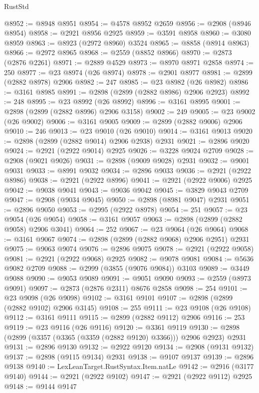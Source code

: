 \begin{lexlean}{RustStd}
\begin{coremodule}
@8952 := @8948 @8951
@8954 := @4578 @8952 @2659
@8956 := @2908 (@8946 @8954)
@8958 := @2921 @8956 @2925
@8959 := @3591 @8958
@8960 := @3080 @8959
@8963 := @8923 (@2972 @8960) @3524
@8965 := @8858 (@8914 @8963)
@8966 := @2972 @8965
@8968 := @2559 (@8852 @8966)
@8970 := @2873 (@2876 @2261)
@8971 := @2889 @4529
@8973 := @8970 @8971 @2858
@8974 := 250
@8977 := @23 @8974 (@26 @8974)
@8978 := @2901 @8977
@8981 := @2899 (@2882 @8978) @2906
@8982 := 247
@8985 := @23 @8982 (@26 @8982)
@8986 := @3161 @8985
@8991 := @2898 (@2899 (@2882 @8986) @2906 @2923)
@8992 := 248
@8995 := @23 @8992 (@26 @8992)
@8996 := @3161 @8995
@9001 := @2898 (@2899 (@2882 @8996) @2906 @3158)
@9002 := 249
@9005 := @23 @9002 (@26 @9002)
@9006 := @3161 @9005
@9009 := @2899 (@2882 @9006) @2906
@9010 := 246
@9013 := @23 @9010 (@26 @9010)
@9014 := @3161 @9013
@9020 := @2898 (@2899 (@2882 @9014) @2906 @2938) @2931
@9021 := @2896 @9020
@9024 := @2921 (@2922 @9014) @2925
@9026 := @3228 @9024 @2709
@9028 := @2908 (@9021 @9026)
@9031 := @2898 (@9009 @9028) @2931
@9032 := @9001 @9031
@9033 := @8991 @9032
@9034 := @2896 @9033
@9036 := @2921 (@2922 @8986)
@9038 := @2921 (@2922 @8996)
@9041 := @2921 (@2922 @9006) @2925
@9042 := @9038 @9041
@9043 := @9036 @9042
@9045 := @3829 @9043 @2709
@9047 := @2908 (@9034 @9045)
@9050 := @2898 (@8981 @9047) @2931
@9051 := @2896 @9050
@9053 := @2995 (@2922 @8978)
@9054 := 251
@9057 := @23 @9054 (@26 @9054)
@9058 := @3161 @9057
@9063 := @2898 (@2899 (@2882 @9058) @2906 @3041)
@9064 := 252
@9067 := @23 @9064 (@26 @9064)
@9068 := @3161 @9067
@9074 := @2898 (@2899 (@2882 @9068) @2906 @2951) @2931
@9075 := @9063 @9074
@9076 := @2896 @9075
@9078 := @2921 (@2922 @9058)
@9081 := @2921 (@2922 @9068) @2925
@9082 := @9078 @9081
@9084 := @5636 @9082 @2709
@9088 := @2999 (@3855 (@9076 @9084)) @3103
@9089 := @3449 @9088
@9090 := @9053 @9089
@9091 := @9051 @9090
@9093 := @2559 (@8973 @9091)
@9097 := @2873 (@2876 @2311) @8676 @2858
@9098 := 254
@9101 := @23 @9098 (@26 @9098)
@9102 := @3161 @9101
@9107 := @2898 (@2899 (@2882 @9102) @2906 @3145)
@9108 := 255
@9111 := @23 @9108 (@26 @9108)
@9112 := @3161 @9111
@9115 := @2899 (@2882 @9112) @2906
@9116 := 253
@9119 := @23 @9116 (@26 @9116)
@9120 := @3361 @9119
@9130 := @2898 (@2899 (@3357 (@3365 (@3359 (@2882 @9120) @3366))) @2906 @2923) @2931
@9131 := @2896 @9130
@9132 := @2922 @9120
@9134 := @2908 (@9131 @9132)
@9137 := @2898 (@9115 @9134) @2931
@9138 := @9107 @9137
@9139 := @2896 @9138
@9140 := LexLeanTarget.RustSyntax.Item.natLe
@9142 := @2916 (@3177 @9140)
@9144 := @2921 (@2922 @9102)
@9147 := @2921 (@2922 @9112) @2925
@9148 := @9144 @9147

\end{coremodule}
\end{lexlean}
